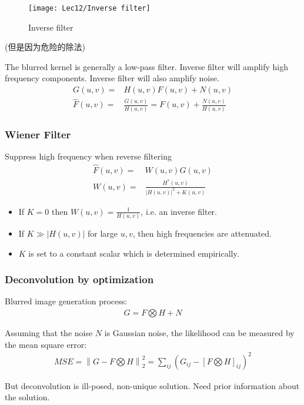 \begin{figure}[H]
    \centering
    \texttt{[image: Lec12/Inverse filter]}
    \caption{Inverse filter}
\end{figure}

(但是因为危险的除法)

The blurred kernel is generally a low-pass filter. Inverse filter will amplify high frequency components. Inverse filter will also amplify noise. 
\begin{align*}
    G(u,v)=&H(u,v)F(u,v)+N(u,v)\\
    \hat{F}(u,v)=&\frac{G(u,v)}{H(u,v)}=F(u,v)+\frac{N(u,v)}{H(u,v)}
\end{align*}

\subsubsection{Wiener Filter}
Suppress high frequency when reverse filtering
\begin{align*}
    \hat{F}(u,v)=&W(u,v)G(u,v)\\
    W(u,v)=&\frac{H^*(u,v)}{\left|H(u,v)\right|^2+K(u,v)}
\end{align*}

\begin{itemize}
    \item If $K=0$ then $W(u,v)=\frac{1}{H(u,v)}$, i.e. an inverse filter. 
    \item If $K \gg \left|H(u,v)\right|$ for large $u,v$, then high frequencies are attenuated. 
    \item $K$ is set to a constant scalar which is determined empirically. 
\end{itemize}

\subsubsection{Deconvolution by optimization}
Blurred image generation process:
\begin{align*}
    G=F \bigotimes H+N
\end{align*}

Assuming that the noise $N$ is Gaussian noise, the
likelihood can be measured by the mean square error:
\begin{align*}
    MSE=\left\| G-F \bigotimes H \right\|_2^2=\sum_{ij}\left( G_{ij}-\left[ F \bigotimes H \right]_{ij} \right)^2
\end{align*}

But deconvolution is ill-posed, non-unique solution. Need prior information about the solution. 

